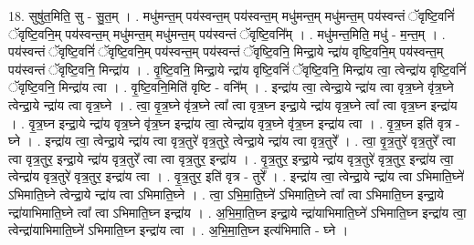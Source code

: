 \documentclass[17pt]{extarticle}
\begin{document}
18. सुषु॑त॒मिति॒ सु - सु॒त॒म् । . मधु॑मन्त॒म् पय॑स्वन्त॒म् पय॑स्वन्त॒म् मधु॑मन्त॒म् मधु॑मन्त॒म् पय॑स्वन्तं ॅवृष्टि॒वनिं॑ ॅवृष्टि॒वनि॒म् पय॑स्वन्त॒म् मधु॑मन्त॒म् मधु॑मन्त॒म् पय॑स्वन्तं ॅवृष्टि॒वनि᳚म् । . मधु॑मन्त॒मिति॒ मधु॑ - म॒न्त॒म् । . पय॑स्वन्तं ॅवृष्टि॒वनिं॑ ॅवृष्टि॒वनि॒म् पय॑स्वन्त॒म् पय॑स्वन्तं ॅवृष्टि॒वनि॒ मिन्द्रा॒ये न्द्रा॑य वृष्टि॒वनि॒म् पय॑स्वन्त॒म् पय॑स्वन्तं ॅवृष्टि॒वनि॒ मिन्द्रा॑य । . वृ॒ष्टि॒वनि॒ मिन्द्रा॒ये न्द्रा॑य वृष्टि॒वनिं॑ ॅवृष्टि॒वनि॒ मिन्द्रा॑य त्वा॒ त्वेन्द्रा॑य वृष्टि॒वनिं॑ ॅवृष्टि॒वनि॒ मिन्द्रा॑य त्वा । . वृ॒ष्टि॒वनि॒मिति॑ वृष्टि - वनि᳚म् । . इन्द्रा॑य त्वा॒ त्वेन्द्रा॒ये न्द्रा॑य त्वा वृत्र॒घ्ने वृ॑त्र॒घ्ने त्वेन्द्रा॒ये न्द्रा॑य त्वा वृत्र॒घ्ने । . त्वा॒ वृ॒त्र॒घ्ने वृ॑त्र॒घ्ने त्वा᳚ त्वा वृत्र॒घ्न इन्द्रा॒ये न्द्रा॑य वृत्र॒घ्ने त्वा᳚ त्वा वृत्र॒घ्न इन्द्रा॑य । . वृ॒त्र॒घ्न इन्द्रा॒ये न्द्रा॑य वृत्र॒घ्ने वृ॑त्र॒घ्न इन्द्रा॑य त्वा॒ त्वेन्द्रा॑य वृत्र॒घ्ने वृ॑त्र॒घ्न इन्द्रा॑य त्वा । . वृ॒त्र॒घ्न इति॑ वृत्र - घ्ने । . इन्द्रा॑य त्वा॒ त्वेन्द्रा॒ये न्द्रा॑य त्वा वृत्र॒तुरे॑ वृत्र॒तुरे॒ त्वेन्द्रा॒ये न्द्रा॑य त्वा वृत्र॒तुरे᳚ । . त्वा॒ वृ॒त्र॒तुरे॑ वृत्र॒तुरे᳚ त्वा त्वा वृत्र॒तुर॒ इन्द्रा॒ये न्द्रा॑य वृत्र॒तुरे᳚ त्वा त्वा वृत्र॒तुर॒ इन्द्रा॑य । . वृ॒त्र॒तुर॒ इन्द्रा॒ये न्द्रा॑य वृत्र॒तुरे॑ वृत्र॒तुर॒ इन्द्रा॑य त्वा॒ त्वेन्द्रा॑य वृत्र॒तुरे॑ वृत्र॒तुर॒ इन्द्रा॑य त्वा । . वृ॒त्र॒तुर॒ इति॑ वृत्र - तुरे᳚ । . इन्द्रा॑य त्वा॒ त्वेन्द्रा॒ये न्द्रा॑य त्वा ऽभिमाति॒घ्ने॑ ऽभिमाति॒घ्ने त्वेन्द्रा॒ये न्द्रा॑य त्वा ऽभिमाति॒घ्ने । . त्वा॒ ऽभि॒मा॒ति॒घ्ने॑ ऽभिमाति॒घ्ने त्वा᳚ त्वा ऽभिमाति॒घ्न इन्द्रा॒ये न्द्रा॑याभिमाति॒घ्ने त्वा᳚ त्वा ऽभिमाति॒घ्न इन्द्रा॑य । . अ॒भि॒मा॒ति॒घ्न इन्द्रा॒ये न्द्रा॑याभिमाति॒घ्ने॑ ऽभिमाति॒घ्न इन्द्रा॑य त्वा॒ त्वेन्द्रा॑याभिमाति॒घ्ने॑ ऽभिमाति॒घ्न इन्द्रा॑य त्वा । . अ॒भि॒मा॒ति॒घ्न इत्य॑भिमाति - घ्ने । \newline
\end{document}
